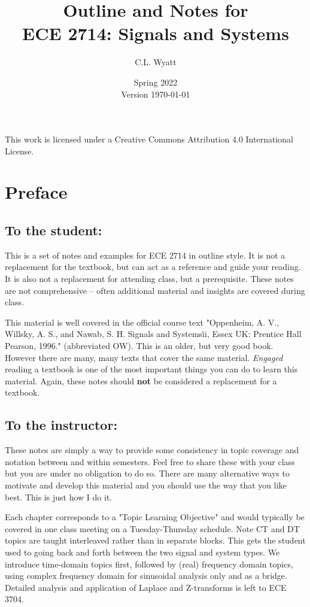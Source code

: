 \documentclass[]{book}
\theoremstyle{definition}
\numberwithin{section}{chapter}
\numberwithin{equation}{chapter}
\begin{document}
\frontmatter

\title{Outline and Notes for\\ ECE 2714: Signals and Systems}
\author{C.L. Wyatt}
\date{Spring 2022\\Version \today}
\maketitle
This work is licensed under a Creative Commons Attribution 4.0 International License.

\chapter*{Preface}

\section*{To the student:}
This is a set of notes and examples for ECE 2714 in outline style. It is not a replacement for the textbook, but can act as a reference and guide your reading. It is also not a replacement for attending class, but a prerequisite. These notes are not comprehensive -- often additional material and insights are covered during class.

This material is well covered in the official course text "Oppenheim, A. V., Willsky, A. S., and Nawab, S. H. Signals and Systems\. ii, Essex UK: Prentice Hall Pearson, 1996." \cite{OW} (abbreviated OW). This is an older, but very good book. However there are many, many texts that cover the same material. \textit{Engaged} reading a textbook is one of the most important things you can do to learn this material. Again, these notes should \textbf{not} be considered a replacement for a textbook.

\section*{To the instructor:}
These notes are simply a way to provide some consistency in topic coverage and notation between and within semesters. Feel free to share these with your class but you are under no obligation to do so. There are many alternative ways to motivate and develop this material and you should use the way that you like best. This is just how I do it.

Each chapter corresponds to a "Topic Learning Objective" and would typically be covered in one class meeting on a Tuesday-Thursday schedule. Note CT and DT topics are taught interleaved rather than in separate blocks. This gets the student used to going back and forth between the two signal and system types. We introduce time-domain topics first, followed by (real) frequency domain topics, using complex frequency domain for sinusoidal analysis only and as a bridge. Detailed analysis and application of Laplace and Z-transforms is left to ECE 3704. 
\end{document}
